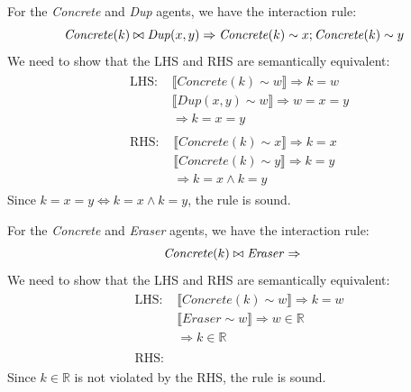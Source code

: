 \begin{lemma}
	For the \textit{Concrete} and \textit{Dup} agents, we have the interaction rule:
	$$
	\mathit{Concrete}(k) \bowtie \mathit{Dup}(x, y) \Rightarrow \mathit{Concrete}(k) \sim x; \mathit{Concrete}(k) \sim y \\
	$$
	We need to show that the LHS and RHS are semantically equivalent:
	$$
	\begin{aligned}
		& \begin{aligned}
			\text{LHS: } & \llbracket \mathit{Concrete}(k) \sim w \rrbracket \Rightarrow k = w \\
			& \llbracket \mathit{Dup}(x, y) \sim w \rrbracket \Rightarrow w = x = y \\
			& \Rightarrow k = x = y
		\end{aligned} \\
		& \begin{aligned}
			\text{RHS: } & \llbracket \mathit{Concrete}(k) \sim x \rrbracket \Rightarrow k = x \\
			& \llbracket \mathit{Concrete}(k) \sim y \rrbracket \Rightarrow k = y \\
			& \Rightarrow k = x \land k = y
		\end{aligned}
	\end{aligned}
	$$
	Since $k = x = y \iff k = x \land k = y$, the rule is sound.
\end{lemma}

\begin{lemma}
	For the \textit{Concrete} and \textit{Eraser} agents, we have the interaction rule:
	$$
	\mathit{Concrete}(k) \bowtie \mathit{Eraser} \Rightarrow  \\
	$$
	We need to show that the LHS and RHS are semantically equivalent:
	$$
	\begin{aligned}
		& \begin{aligned}
			\text{LHS: } & \llbracket \mathit{Concrete}(k) \sim w \rrbracket \Rightarrow k = w \\
			& \llbracket \mathit{Eraser} \sim w \rrbracket \Rightarrow w \in \mathbb{R} \\
			& \Rightarrow k \in \mathbb{R} 
		\end{aligned} \\
		& \begin{aligned}
			\text{RHS: }
		\end{aligned}
	\end{aligned}
	$$
	Since $k \in \mathbb{R}$ is not violated by the RHS, the rule is sound.
\end{lemma}

